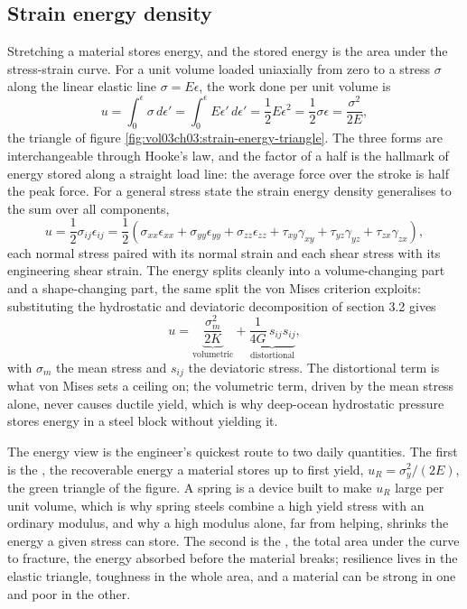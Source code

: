\subsection{Strain energy density}

Stretching a material stores energy, and the stored energy is the area
under the stress-strain curve. For a unit volume loaded uniaxially from
zero to a stress $\sigma$ along the linear elastic line $\sigma = E
\epsilon$, the work done per unit volume is
\[
u = \int_0^{\epsilon} \sigma\,d\epsilon' = \int_0^{\epsilon} E
\epsilon'\,d\epsilon' = \frac{1}{2}E\epsilon^2 = \frac{1}{2}\sigma
\epsilon = \frac{\sigma^2}{2E},
\]
the triangle of figure \ref{fig:vol03ch03:strain-energy-triangle}. The
three forms are interchangeable through Hooke's law, and the factor of a
half is the hallmark of energy stored along a straight load line: the
average force over the stroke is half the peak force. For a general
stress state the strain energy density generalises to the sum over all
components,
\[
u = \frac{1}{2}\sigma_{ij}\epsilon_{ij} = \frac{1}{2}\left(\sigma_{xx}
\epsilon_{xx} + \sigma_{yy}\epsilon_{yy} + \sigma_{zz}\epsilon_{zz} +
\tau_{xy}\gamma_{xy} + \tau_{yz}\gamma_{yz} + \tau_{zx}\gamma_{zx}
\right),
\]
each normal stress paired with its normal strain and each shear stress
with its engineering shear strain. The energy splits cleanly into a
volume-changing part and a shape-changing part, the same split the von
Mises criterion exploits: substituting the hydrostatic and deviatoric
decomposition of section 3.2 gives
\[
u = \underbrace{\frac{\sigma_m^2}{2K}}_{\text{volumetric}} +
\underbrace{\frac{1}{4G}\,s_{ij}s_{ij}}_{\text{distortional}},
\]
with $\sigma_m$ the mean stress and $s_{ij}$ the deviatoric stress. The
distortional term is what von Mises sets a ceiling on; the volumetric
term, driven by the mean stress alone, never causes ductile yield, which
is why deep-ocean hydrostatic pressure stores energy in a steel block
without yielding it.



The energy view is the engineer's quickest route to two daily quantities.
The first is the , the recoverable energy
a material stores up to first yield, $u_R = \sigma_y^2/(2E)$, the green
triangle of the figure. A spring is a device built to make $u_R$ large
per unit volume, which is why spring steels combine a high yield stress
with an ordinary modulus, and why a high modulus alone, far from helping,
shrinks the energy a given stress can store. The second is the
, the total area under the curve to fracture, the
energy absorbed before the material breaks; resilience lives in the
elastic triangle, toughness in the whole area, and a material can be
strong in one and poor in the other.

